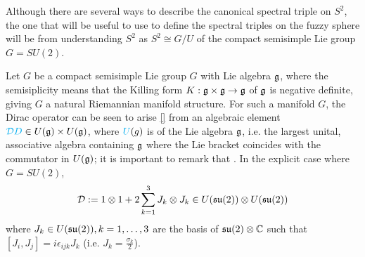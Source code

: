 \linea

Although there are several ways to describe the canonical spectral triple on  $S^2$, the one that will be useful to use to define the spectral triples on the fuzzy sphere will be from understanding $S^2$ as  $S^2 \cong G/U$ of the compact semisimple Lie group $G = SU(2)$.

Let $G$ be a compact semisimple Lie group $G$ with Lie algebra $\mathfrak{g}$, where the semisiplicity means that the Killing form $K: \mathfrak{g} \times \mathfrak{g} \to \mathfrak{g}$ of $\mathfrak{g}$ is negative definite, giving $G$ a natural Riemannian manifold structure. For such a manifold $G$, the Dirac operator can be seen to arise \ref{} from an algebraic element $\textcolor{cyan}{\mathcal D D} \in U(\mathfrak{g})\times U(\mathfrak{g})$, where $\textcolor{cyan}{U}(g)$ is  of the Lie algebra $\mathfrak{g}$, i.e. the largest  unital, associative algebra containing $\mathfrak{g}$ where the Lie bracket coincides with the commutator in $U(\mathfrak{g})$; it is important to remark that . In the explicit case where $G = SU(2)$,
\begin{equation}
    \mathcal D := 1 \otimes 1 + 2 \sum_{k = 1}^3 J_k \otimes J_k \in U(\mathfrak{su}(2)) \otimes U(\mathfrak{su}(2))
\end{equation}
where $J_k \in U(\mathfrak{su}(2)), k = 1, \dots, 3$ are the basis of $\mathfrak{su}(2)\otimes \mathbb{C}$ such that $[J_i, J_j] = i \epsilon_{ijk} J_k$ (i.e. $J_k = \frac{\sigma_k}{2}$). 

